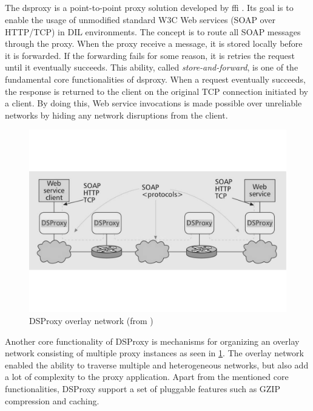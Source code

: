 \subsection{}

The \gls{dsproxy} is a point-to-point proxy solution developed by \gls{ffi}
\cite{dsproxy-ffi}\cite{ieee-dsproxy}. Its goal is to enable the usage of
unmodified standard W3C Web services (SOAP over HTTP/TCP) in DIL environments.
The concept is to route all SOAP messages through the proxy. When the proxy
receive a message, it is stored locally before it is forwarded. If the
forwarding fails for some reason, it is retries the request until it eventually
succeeds. This ability, called \textit{store-and-forward}, is one of the
fundamental core functionalities of \gls{dsproxy}. When a request eventually
succeeds, the response is returned to the client on the original TCP connection
initiated by a client. By doing this, Web service invocations is made possible
over unreliable networks by hiding any network disruptions from the client.

\begin{figure}[h]
\includegraphics[scale=0.35]{images/dsproxy_gray.pdf}
\caption{DSProxy overlay network (from \cite{ieee-dsproxy} )}
\label{figure:dsproxy}
\end{figure}

Another core functionality of DSProxy is mechanisms for organizing an overlay
network consisting of multiple proxy instances as seen in \cref{figure:dsproxy}.
The overlay network enabled the ability to traverse multiple and heterogeneous
networks, but also add a lot of complexity to the proxy application. Apart from
the mentioned core functionalities, DSProxy support a set of pluggable
features such as GZIP compression and caching.

